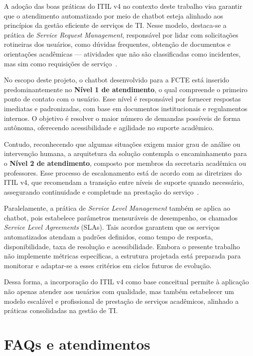 A adoção das boas práticas do ITIL v4 no contexto deste trabalho visa garantir que o atendimento automatizado por meio de chatbot esteja alinhado aos princípios da gestão eficiente de serviços de TI. Nesse modelo, destaca-se a prática de \textit{Service Request Management}, responsável por lidar com solicitações rotineiras dos usuários, como dúvidas frequentes, obtenção de documentos e orientações acadêmicas — atividades que não são classificadas como incidentes, mas sim como requisições de serviço~\cite{axelos2019itil}.

No escopo deste projeto, o chatbot desenvolvido para a FCTE está inserido predominantemente no \textbf{Nível 1 de atendimento}, o qual compreende o primeiro ponto de contato com o usuário. Esse nível é responsável por fornecer respostas imediatas e padronizadas, com base em documentos institucionais e regulamentos internos. O objetivo é resolver o maior número de demandas possíveis de forma autônoma, oferecendo acessibilidade e agilidade no suporte acadêmico.

Contudo, reconhecendo que algumas situações exigem maior grau de análise ou intervenção humana, a arquitetura da solução contempla o encaminhamento para o \textbf{Nível 2 de atendimento}, composto por membros da secretaria acadêmica ou professores. Esse processo de escalonamento está de acordo com as diretrizes do ITIL v4, que recomendam a transição entre níveis de suporte quando necessário, assegurando continuidade e completude na prestação do serviço~\cite{axelos2019itil}.

Paralelamente, a prática de \textit{Service Level Management} também se aplica ao chatbot, pois estabelece parâmetros mensuráveis de desempenho, os chamados \textit{Service Level Agreements} (SLAs). Tais acordos garantem que os serviços automatizados atendam a padrões definidos, como tempo de resposta, disponibilidade, taxa de resolução e acessibilidade. Embora o presente trabalho não implemente métricas específicas, a estrutura projetada está preparada para monitorar e adaptar-se a esses critérios em ciclos futuros de evolução.

Dessa forma, a incorporação do ITIL v4 como base conceitual permite à aplicação não apenas atender aos usuários com qualidade, mas também estabelecer um modelo escalável e profissional de prestação de serviços acadêmicos, alinhado a práticas consolidadas na gestão de TI.

\section{FAQs e atendimentos}

